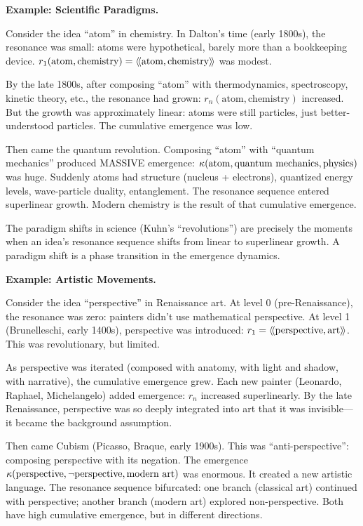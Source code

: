 \begin{interpretation}
\textbf{Example: Scientific Paradigms.}

Consider the idea ``atom'' in chemistry. In Dalton's time (early 1800s), the
resonance was small: atoms were hypothetical, barely more than a bookkeeping
device. $r_1(\text{atom}, \text{chemistry}) = \langle\!\langle \text{atom}, \text{chemistry} \rangle\!\rangle$
was modest.

By the late 1800s, after composing ``atom'' with thermodynamics, spectroscopy,
kinetic theory, etc., the resonance had grown: $r_n(\text{atom}, \text{chemistry})$
increased. But the growth was approximately linear: atoms were still particles,
just better-understood particles. The cumulative emergence was low.

Then came the quantum revolution. Composing ``atom'' with ``quantum mechanics''
produced MASSIVE emergence: $\kappa(\text{atom}, \text{quantum mechanics}, \text{physics})$
was huge. Suddenly atoms had structure (nucleus + electrons), quantized energy
levels, wave-particle duality, entanglement. The resonance sequence entered
superlinear growth. Modern chemistry is the result of that cumulative emergence.

The paradigm shifts in science (Kuhn's ``revolutions'') are precisely the moments
when an idea's resonance sequence shifts from linear to superlinear growth. A
paradigm shift is a phase transition in the emergence dynamics.

\textbf{Example: Artistic Movements.}

Consider the idea ``perspective'' in Renaissance art. At level 0 (pre-Renaissance),
the resonance was zero: painters didn't use mathematical perspective. At level 1
(Brunelleschi, early 1400s), perspective was introduced: $r_1 = \langle\!\langle \text{perspective}, \text{art} \rangle\!\rangle$.
This was revolutionary, but limited.

As perspective was iterated (composed with anatomy, with light and shadow, with
narrative), the cumulative emergence grew. Each new painter (Leonardo, Raphael,
Michelangelo) added emergence: $r_n$ increased superlinearly. By the late
Renaissance, perspective was so deeply integrated into art that it was invisible---it
became the background assumption.

Then came Cubism (Picasso, Braque, early 1900s). This was ``anti-perspective'':
composing perspective with its negation. The emergence
$\kappa(\text{perspective}, \neg\text{perspective}, \text{modern art})$ was
enormous. It created a new artistic language. The resonance sequence bifurcated:
one branch (classical art) continued with perspective; another branch (modern art)
explored non-perspective. Both have high cumulative emergence, but in different
directions.


\end{interpretation}
